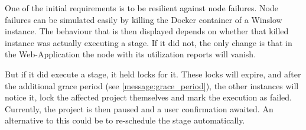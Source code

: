 
One of the initial requirements is to be resilient against node failures.
Node failures can be simulated easily by killing the Docker container of a Winslow instance.
The behaviour that is then displayed depends on whether that killed instance was actually executing a stage.
If it did not, the only change is that in the Web-Application the node with its utilization reports will vanish.

But if it did execute a stage, it held locks for it.
These locks will expire, and after the additional grace period (see \autoref{message:grace_period}), the other instances will notice it, lock the affected project themselves and mark the execution as failed.
Currently, the project is then paused and a user confirmation awaited.
An alternative to this could be to re-schedule the stage automatically.
